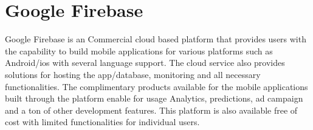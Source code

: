 \section{Google Firebase}
Google Firebase is an Commercial cloud based platform that provides users with
the capability to build mobile applications for various platforms such as
Android/ios with several language support. The cloud service also provides
solutions for hosting the app/database, monitoring and all necessary
functionalities. The complimentary products available for the mobile
applications built through the platform enable for usage Analytics, predictions,
 ad campaign and a ton of other development features. This platform is also
 available free of cost with limited functionalities for individual users.
